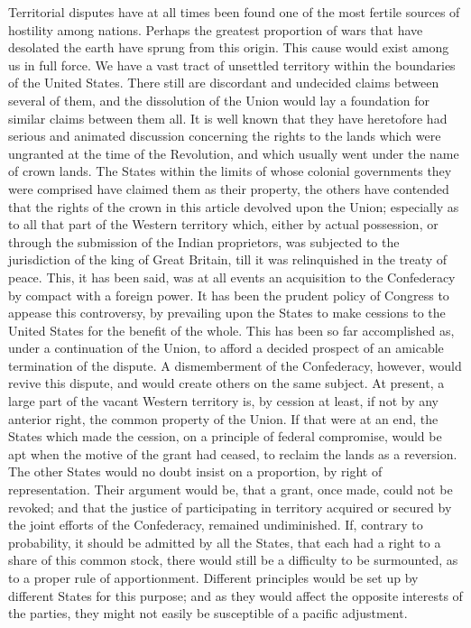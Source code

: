 Territorial disputes have at all times been found one of the most fertile sources of hostility among nations. Perhaps the greatest proportion of wars that have desolated the earth have sprung from this origin. This cause would exist among us in full force. We have a vast tract of unsettled territory within the boundaries of the United States. There still are discordant and undecided claims between several of them, and the dissolution of the Union would lay a foundation for similar claims between them all. It is well known that they have heretofore had serious and animated discussion concerning the rights to the lands which were ungranted at the time of the Revolution, and which usually went under the name of crown lands. The States within the limits of whose colonial governments they were comprised have claimed them as their property, the others have contended that the rights of the crown in this article devolved upon the Union; especially as to all that part of the Western territory which, either by actual possession, or through the submission of the Indian proprietors, was subjected to the jurisdiction of the king of Great Britain, till it was relinquished in the treaty of peace. This, it has been said, was at all events an acquisition to the Confederacy by compact with a foreign power. It has been the prudent policy of Congress to appease this controversy, by prevailing upon the States to make cessions to the United States for the benefit of the whole. This has been so far accomplished as, under a continuation of the Union, to afford a decided prospect of an amicable termination of the dispute. A dismemberment of the Confederacy, however, would revive this dispute, and would create others on the same subject. At present, a large part of the vacant Western territory is, by cession at least, if not by any anterior right, the common property of the Union. If that were at an end, the States which made the cession, on a principle of federal compromise, would be apt when the motive of the grant had ceased, to reclaim the lands as a reversion. The other States would no doubt insist on a proportion, by right of representation. Their argument would be, that a grant, once made, could not be revoked; and that the justice of participating in territory acquired or secured by the joint efforts of the Confederacy, remained undiminished. If, contrary to probability, it should be admitted by all the States, that each had a right to a share of this common stock, there would still be a difficulty to be surmounted, as to a proper rule of apportionment. Different principles would be set up by different States for this purpose; and as they would affect the opposite interests of the parties, they might not easily be susceptible of a pacific adjustment.

